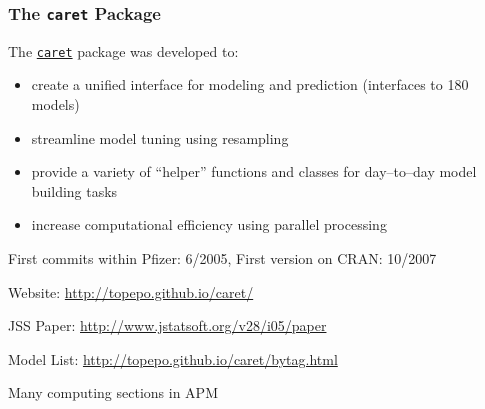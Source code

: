 \documentclass[12 pt]{beamer}\usepackage[]{graphicx}\usepackage[]{color}
\newcommand{\pkg}[1]{{\fontseries{b}\selectfont #1}}
\renewcommand{\pkg}[1]{{\color{darkgreen}\texttt{#1}}}
\begin{document}
  \begin{frame}[fragile]
\frametitle{The \pkg{caret} Package}

The \href{http://cran.r-project.org/web/packages/caret/index.html}{\pkg{caret}}  package was developed to:
  \begin{itemize}
\item create a unified interface for modeling and prediction
(interfaces to 180 models)
\item streamline model tuning using resampling
\item provide a variety of ``helper'' functions and classes for day--to--day model building tasks
\item increase computational efficiency using parallel processing
\end{itemize}

\vspace{.08in}

First commits within Pfizer: 6/2005, First version on CRAN: 10/2007

\vspace{.06in}

Website: \href{http://topepo.github.io/caret/}{http://topepo.github.io/caret/}

\vspace{.06in}

JSS Paper: \href{http://www.jstatsoft.org/v28/i05/paper}{http://www.jstatsoft.org/v28/i05/paper}

\vspace{.06in}

Model List: \href{http://topepo.github.io/caret/bytag.html}{http://topepo.github.io/caret/bytag.html}

\vspace{.06in}

Many computing sections in APM

\end{frame}

\end{document}
